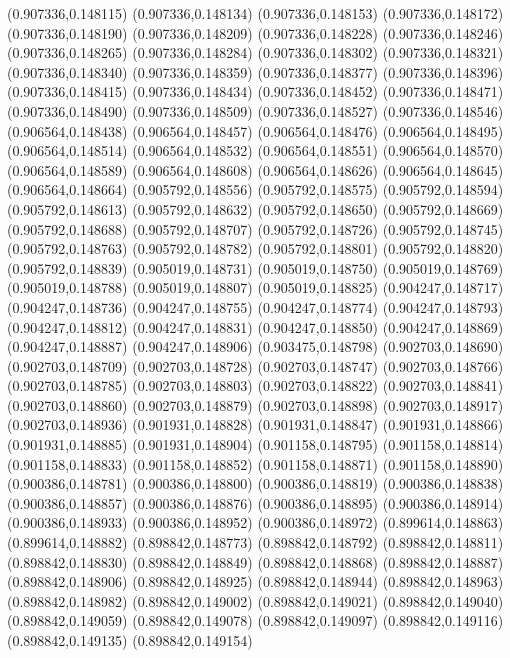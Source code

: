 (0.907336,0.148115)
(0.907336,0.148134)
(0.907336,0.148153)
(0.907336,0.148172)
(0.907336,0.148190)
(0.907336,0.148209)
(0.907336,0.148228)
(0.907336,0.148246)
(0.907336,0.148265)
(0.907336,0.148284)
(0.907336,0.148302)
(0.907336,0.148321)
(0.907336,0.148340)
(0.907336,0.148359)
(0.907336,0.148377)
(0.907336,0.148396)
(0.907336,0.148415)
(0.907336,0.148434)
(0.907336,0.148452)
(0.907336,0.148471)
(0.907336,0.148490)
(0.907336,0.148509)
(0.907336,0.148527)
(0.907336,0.148546)
(0.906564,0.148438)
(0.906564,0.148457)
(0.906564,0.148476)
(0.906564,0.148495)
(0.906564,0.148514)
(0.906564,0.148532)
(0.906564,0.148551)
(0.906564,0.148570)
(0.906564,0.148589)
(0.906564,0.148608)
(0.906564,0.148626)
(0.906564,0.148645)
(0.906564,0.148664)
(0.905792,0.148556)
(0.905792,0.148575)
(0.905792,0.148594)
(0.905792,0.148613)
(0.905792,0.148632)
(0.905792,0.148650)
(0.905792,0.148669)
(0.905792,0.148688)
(0.905792,0.148707)
(0.905792,0.148726)
(0.905792,0.148745)
(0.905792,0.148763)
(0.905792,0.148782)
(0.905792,0.148801)
(0.905792,0.148820)
(0.905792,0.148839)
(0.905019,0.148731)
(0.905019,0.148750)
(0.905019,0.148769)
(0.905019,0.148788)
(0.905019,0.148807)
(0.905019,0.148825)
(0.904247,0.148717)
(0.904247,0.148736)
(0.904247,0.148755)
(0.904247,0.148774)
(0.904247,0.148793)
(0.904247,0.148812)
(0.904247,0.148831)
(0.904247,0.148850)
(0.904247,0.148869)
(0.904247,0.148887)
(0.904247,0.148906)
(0.903475,0.148798)
(0.902703,0.148690)
(0.902703,0.148709)
(0.902703,0.148728)
(0.902703,0.148747)
(0.902703,0.148766)
(0.902703,0.148785)
(0.902703,0.148803)
(0.902703,0.148822)
(0.902703,0.148841)
(0.902703,0.148860)
(0.902703,0.148879)
(0.902703,0.148898)
(0.902703,0.148917)
(0.902703,0.148936)
(0.901931,0.148828)
(0.901931,0.148847)
(0.901931,0.148866)
(0.901931,0.148885)
(0.901931,0.148904)
(0.901158,0.148795)
(0.901158,0.148814)
(0.901158,0.148833)
(0.901158,0.148852)
(0.901158,0.148871)
(0.901158,0.148890)
(0.900386,0.148781)
(0.900386,0.148800)
(0.900386,0.148819)
(0.900386,0.148838)
(0.900386,0.148857)
(0.900386,0.148876)
(0.900386,0.148895)
(0.900386,0.148914)
(0.900386,0.148933)
(0.900386,0.148952)
(0.900386,0.148972)
(0.899614,0.148863)
(0.899614,0.148882)
(0.898842,0.148773)
(0.898842,0.148792)
(0.898842,0.148811)
(0.898842,0.148830)
(0.898842,0.148849)
(0.898842,0.148868)
(0.898842,0.148887)
(0.898842,0.148906)
(0.898842,0.148925)
(0.898842,0.148944)
(0.898842,0.148963)
(0.898842,0.148982)
(0.898842,0.149002)
(0.898842,0.149021)
(0.898842,0.149040)
(0.898842,0.149059)
(0.898842,0.149078)
(0.898842,0.149097)
(0.898842,0.149116)
(0.898842,0.149135)
(0.898842,0.149154)
